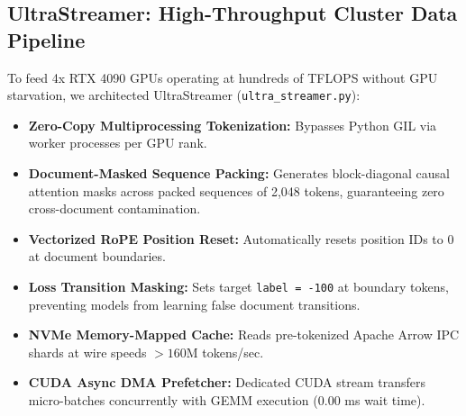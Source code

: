 \documentclass[11pt,a4paper]{article}
\begin{document}
\begin{table}[h]
\centering
\small
\caption{Empirical verification and memory efficiency of custom Triton kernels on RTX 4090.}
\vspace{0.4em}
\label{tab:triton}
\end{table}

\subsection{UltraStreamer: High-Throughput Cluster Data Pipeline}

To feed 4x RTX 4090 GPUs operating at hundreds of TFLOPS without GPU starvation, we architected UltraStreamer (\texttt{ultra\_streamer.py}):
\begin{itemize}
    \item \textbf{Zero-Copy Multiprocessing Tokenization:} Bypasses Python GIL via worker processes per GPU rank.
    \item \textbf{Document-Masked Sequence Packing:} Generates block-diagonal causal attention masks across packed sequences of 2,048 tokens, guaranteeing zero cross-document contamination.
    \item \textbf{Vectorized RoPE Position Reset:} Automatically resets position IDs to 0 at document boundaries.
    \item \textbf{Loss Transition Masking:} Sets target \texttt{label = -100} at boundary tokens, preventing models from learning false document transitions.
    \item \textbf{NVMe Memory-Mapped Cache:} Reads pre-tokenized Apache Arrow IPC shards at wire speeds $> 160$M tokens/sec.
    \item \textbf{CUDA Async DMA Prefetcher:} Dedicated CUDA stream transfers micro-batches concurrently with GEMM execution ($0.00$ ms wait time).
\end{itemize}
\end{document}
